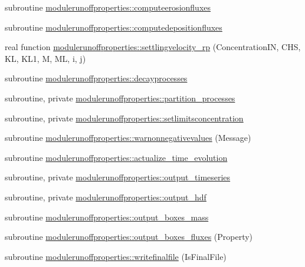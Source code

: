\begin{DoxyCompactItemize}
subroutine \mbox{\hyperlink{namespacemodulerunoffproperties_aa72049d47379b80cbd6f207ff9ac534b}{modulerunoffproperties\+::computeerosionfluxes}}
\item 
subroutine \mbox{\hyperlink{namespacemodulerunoffproperties_a8bbf07614377370c486122ce0f904d0d}{modulerunoffproperties\+::computedepositionfluxes}}
\item 
real function \mbox{\hyperlink{namespacemodulerunoffproperties_a319ef0d7c134a22fa402d33b27472388}{modulerunoffproperties\+::settlingvelocity\+\_\+rp}} (Concentration\+IN, C\+HS, KL, K\+L1, M, ML, i, j)
\item 
subroutine \mbox{\hyperlink{namespacemodulerunoffproperties_a22e352c7bc8cde1c67133693821b9c46}{modulerunoffproperties\+::decayprocesses}}
\item 
subroutine, private \mbox{\hyperlink{namespacemodulerunoffproperties_a6a27cac0933a3a6597bcb4971c40e53b}{modulerunoffproperties\+::partition\+\_\+processes}}
\item 
subroutine, private \mbox{\hyperlink{namespacemodulerunoffproperties_aa9620af1c193dc89f2ab50f709f50f32}{modulerunoffproperties\+::setlimitsconcentration}}
\item 
subroutine \mbox{\hyperlink{namespacemodulerunoffproperties_a1a87c5174a0925e3408e5da2941a3e01}{modulerunoffproperties\+::warnonnegativevalues}} (Message)
\item 
subroutine \mbox{\hyperlink{namespacemodulerunoffproperties_a05009fe293792ec5af707219d9fe4ab0}{modulerunoffproperties\+::actualize\+\_\+time\+\_\+evolution}}
\item 
subroutine, private \mbox{\hyperlink{namespacemodulerunoffproperties_aab6832deb9eca45c9392ee3c49085c37}{modulerunoffproperties\+::output\+\_\+timeseries}}
\item 
subroutine, private \mbox{\hyperlink{namespacemodulerunoffproperties_a7e5f01410c6d0dcb0205da11531d61d7}{modulerunoffproperties\+::output\+\_\+hdf}}
\item 
subroutine \mbox{\hyperlink{namespacemodulerunoffproperties_ad59aaacda5f23a659f2d8cf4d4c29dfa}{modulerunoffproperties\+::output\+\_\+boxes\+\_\+mass}}
\item 
subroutine \mbox{\hyperlink{namespacemodulerunoffproperties_ab76e643833d72d16c6b9e934a268c931}{modulerunoffproperties\+::output\+\_\+boxes\+\_\+fluxes}} (Property)
\item 
subroutine \mbox{\hyperlink{namespacemodulerunoffproperties_a5e8bd361c7dae7925a217f4a40d2c75a}{modulerunoffproperties\+::writefinalfile}} (Is\+Final\+File)
\item 

\end{DoxyCompactItemize}
